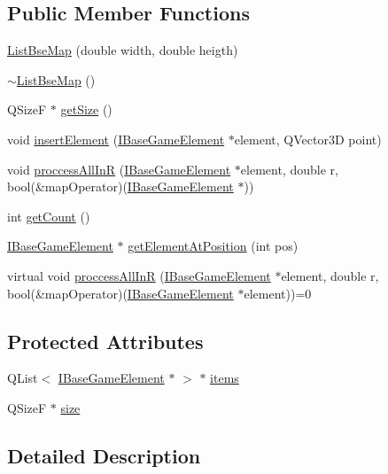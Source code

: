 \subsection*{Public Member Functions}
\begin{DoxyCompactItemize}
\item 
\hyperlink{a00169_aa9b6a13fa97af5ed567966cb8a1bc55f}{List\+Bse\+Map} (double width, double heigth)
\item 
\hyperlink{a00169_a186089a0e91ae5e4d2c76ab03b240842}{$\sim$\+List\+Bse\+Map} ()
\item 
Q\+SizeF $\ast$ \hyperlink{a00169_ae58cec494eba5e73b55bfb2f68fc3b52}{get\+Size} ()
\item 
void \hyperlink{a00169_a7aeae2bf692effb329f9a34604a6c286}{insert\+Element} (\hyperlink{a00137}{I\+Base\+Game\+Element} $\ast$element, Q\+Vector3D point)
\item 
void \hyperlink{a00169_a634c821cf280b64eb56ceac190635b1a}{proccess\+All\+InR} (\hyperlink{a00137}{I\+Base\+Game\+Element} $\ast$element, double r, bool(\&map\+Operator)(\hyperlink{a00137}{I\+Base\+Game\+Element} $\ast$))
\item 
int \hyperlink{a00169_a78e72bacec177f3512323c5fc7db11f3}{get\+Count} ()
\item 
\hyperlink{a00137}{I\+Base\+Game\+Element} $\ast$ \hyperlink{a00169_a6725c6e4231705df32b1074b0b5fdda5}{get\+Element\+At\+Position} (int pos)
\item 
virtual void \hyperlink{a00165_aa4feb51c5d024c99d4c57ccf5d2ff82d}{proccess\+All\+InR} (\hyperlink{a00137}{I\+Base\+Game\+Element} $\ast$element, double r, bool(\&map\+Operator)(\hyperlink{a00137}{I\+Base\+Game\+Element} $\ast$element))=0
\end{DoxyCompactItemize}
\subsection*{Protected Attributes}
\begin{DoxyCompactItemize}
\item 
Q\+List$<$ \hyperlink{a00137}{I\+Base\+Game\+Element} $\ast$ $>$ $\ast$ \hyperlink{a00169_a72a6386e492d05685e86f7fb858e3b32}{items}
\item 
Q\+SizeF $\ast$ \hyperlink{a00169_abbb51f80961cecea1bec63612c5b0fd1}{size}
\end{DoxyCompactItemize}


\subsection{Detailed Description}


